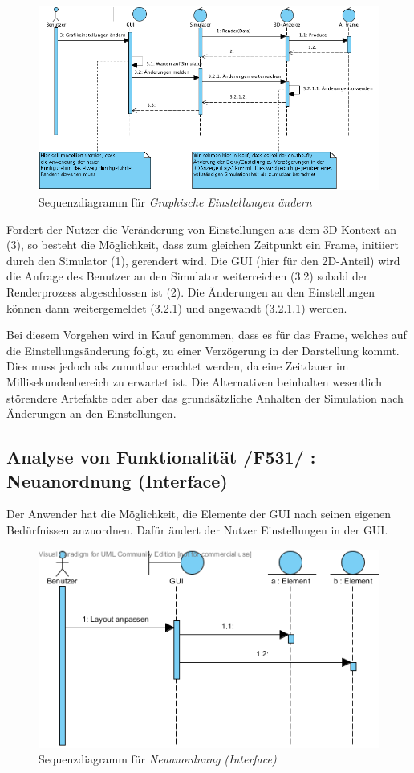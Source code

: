 \begin{figure}
\includegraphics[width=\linewidth]{bilder/change_graphic_config}
\caption{Sequenzdiagramm für \textit{Graphische Einstellungen ändern}}
\end{figure}
Fordert der Nutzer die Veränderung von Einstellungen aus dem 3D-Kontext an (3), so besteht die Möglichkeit, dass zum gleichen Zeitpunkt ein Frame, initiiert durch den Simulator (1), gerendert wird. 
Die GUI (hier für den 2D-Anteil) wird die Anfrage des Benutzer an den Simulator weiterreichen (3.2) sobald der Renderprozess abgeschlossen ist (2). Die Änderungen an den Einstellungen können dann weitergemeldet (3.2.1) und angewandt (3.2.1.1) werden.

Bei diesem Vorgehen wird in Kauf genommen, dass es für das Frame, welches auf die Einstellungsänderung folgt, zu einer Verzögerung in der Darstellung kommt. Dies muss jedoch als zumutbar erachtet werden, da eine Zeitdauer im Millisekundenbereich zu erwartet ist. Die Alternativen beinhalten wesentlich störendere Artefakte oder aber das grundsätzliche Anhalten der Simulation nach Änderungen an den Einstellungen.

\subsection{Analyse von Funktionalität /F531/ :   Neuanordnung (Interface)}
Der Anwender hat die Möglichkeit, die Elemente der GUI nach seinen eigenen Bedürfnissen anzuordnen. Dafür ändert der Nutzer Einstellungen in der GUI.
\begin{figure}
\includegraphics[width=\linewidth]{bilder/Interface_Neuanordnung}
\caption{Sequenzdiagramm für \textit{Neuanordnung (Interface)}}
\end{figure}
